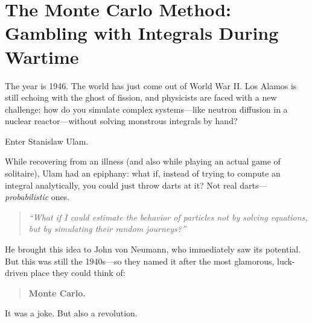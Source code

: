\section{The Monte Carlo Method: Gambling with Integrals During Wartime}

The year is 1946. The world has just come out of World War II. Los Alamos is still echoing with the ghost of fission, and physicists are faced with a new challenge: how do you simulate complex systems—like neutron diffusion in a nuclear reactor—without solving monstrous integrals by hand?

Enter Stanislaw Ulam.

While recovering from an illness (and also while playing an actual game of solitaire), Ulam had an epiphany: what if, instead of trying to compute an integral analytically, you could just throw darts at it? Not real darts—\textit{probabilistic} ones.

\begin{quote}
\textit{“What if I could estimate the behavior of particles not by solving equations, but by simulating their random journeys?”}
\end{quote}

He brought this idea to John von Neumann, who immediately saw its potential. But this was still the 1940s—so they named it after the most glamorous, luck-driven place they could think of:

\begin{quote}
\textbf{Monte Carlo.}
\end{quote}

It was a joke. But also a revolution.

